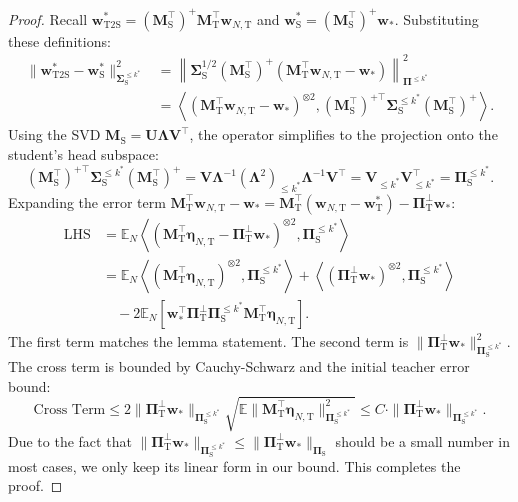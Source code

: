 \documentclass{article}
\theoremstyle{definition}
\theoremstyle{definition}
\theoremstyle{plain}
\theoremstyle{plain}
\theoremstyle{plain}
\theoremstyle{plain}
\theoremstyle{plain}
\newcommand{\bs}[1]{\boldsymbol{\mathbf{#1}}}
\newcommand{\Ex}{\mathbb{E}}
\newcommand{\te}{\mathrm{T}}
\newcommand{\st}{\mathrm{S}}
\newcommand{\ts}{\mathrm{T2S}}
\newcommand{\M}{\mathbf{M}}
\newcommand{\Sig}{\mathbf{\Sigma}}
\newcommand{\w}{\mathbf{w}}
\newcommand{\inner}[1]{\left\langle#1\right\rangle}
\begin{document}
\begin{proof}
    Recall $\w^*_\ts = (\M_\st^\top)^+\M_\te^\top \w_{N,\te}$ and $\w^*_\st = (\M_\st^\top)^+ \w_*$.
    Substituting these definitions:
    \begin{equation}
    \begin{aligned}
        \|\w^*_\ts-\w^*_\st\|_{\Sig_\st^{\leq k^*}}^2 &= \left\| \Sig_\st^{1/2} (\M_\st^\top)^+ (\M_\te^\top \w_{N,\te} - \w_*) \right\|_{\bs \Pi^{\le k^*}}^2 \\
        &= \left\langle (\M_\te^\top \w_{N,\te} - \w_*)^{\otimes 2}, (\M_\st^\top)^{+\top} \Sig_\st^{\le k^*} (\M_\st^\top)^+ \right\rangle.
    \end{aligned}
    \end{equation}
    Using the SVD $\M_\st = \bs U \bs \Lambda \bs V^\top$, the operator simplifies to the projection onto the student's head subspace:
    \begin{equation}
        (\M_\st^\top)^{+\top} \Sig_\st^{\le k^*} (\M_\st^\top)^+ = \bs V \bs \Lambda^{-1} (\bs \Lambda^2)_{\le k^*} \bs \Lambda^{-1} \bs V^\top = \bs V_{\le k^*} \bs V_{\le k^*}^\top = \bs \Pi_\st^{\le k^*}.
    \end{equation}
    Expanding the error term $\M_\te^\top \w_{N,\te} - \w_* = \M_\te^\top (\w_{N,\te} - \w^*_\te) - \bs \Pi_\te^\perp \w_*$:
    \begin{equation}
    \begin{aligned}
        \text{LHS} &= \Ex_N \left\langle (\M_\te^\top \bs\eta_{N,\te} - \bs \Pi_\te^\perp \w_*)^{\otimes 2}, \bs \Pi_\st^{\le k^*} \right\rangle \\
        &= \Ex_N \inner{(\M_\te^\top \bs\eta_{N,\te})^{\otimes 2}, \bs \Pi_\st^{\le k^*}} + \inner{(\bs \Pi_\te^\perp \w_*)^{\otimes 2}, \bs \Pi_\st^{\le k^*}} \\
        &\quad - 2 \Ex_N \left[ \w_*^\top \bs \Pi_\te^\perp \bs \Pi_\st^{\le k^*} \M_\te^\top \bs\eta_{N,\te} \right].
    \end{aligned}
    \end{equation}
    The first term matches the lemma statement. The second term is $\|\bs \Pi_\te^\perp \w_*\|_{\bs \Pi_\st^{\le k^*}}^2$. The cross term is bounded by Cauchy-Schwarz and the initial teacher error bound:
    \begin{equation}
        \text{Cross Term} \le 2 \|\bs \Pi_\te^\perp \w_*\|_{\bs \Pi_\st^{\le k^*}} \sqrt{\Ex \|\M_\te^\top \bs\eta_{N,\te}\|_{\bs \Pi_\st^{\le k^*}}^2} \leq C \cdot \|\bs \Pi_\te^\perp \w_*\|_{\bs \Pi_\st^{\le k^*}}.
    \end{equation}
    Due to the fact that $\|\bs \Pi_\te^\perp \w_*\|_{\bs \Pi_\st^{\le k^*}}\leq\|\bs \Pi_\te^\perp \w_*\|_{\bs \Pi_\st}$ should be a small number in most cases, we only keep its linear form in our bound.
    This completes the proof.
\end{proof}
\end{document}
